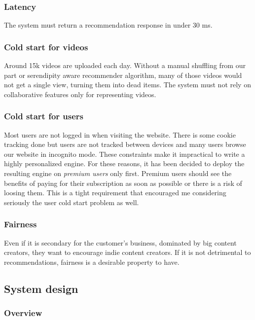 \subsubsection{Latency}
The system must return a recommendation response in under 30 ms.

\subsubsection{Cold start for videos}
Around 15k videos are uploaded each day. Without a manual shuffling from our part or serendipity aware recommender algorithm, many of those videos would not get a single view, turning them into dead items. The system must not rely on collaborative features only for representing videos.

\subsubsection{Cold start for users}
Most users are not logged in when visiting the website. There is some cookie tracking done but users are not tracked between devices and many users browse our website in incognito mode. These constraints make it impractical to write a highly personalized engine. For these reasons, it has been decided to deploy the resulting engine on \emph{premium users} only first. Premium users should see the benefits of paying for their subscription as soon as possible or there is a risk of loosing them. This is a tight requirement that encouraged me considering seriously the user cold start problem as well.

\subsubsection{Fairness}
Even if it is secondary for the customer's business, dominated by big content creators, they want to encourage indie content creators. If it is not detrimental to recommendations, fairness is a desirable property to have.

\subsection{System design}

\subsubsection{Overview}

